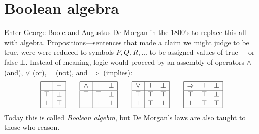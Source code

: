 \section{Boolean algebra}
Enter
George Boole and Augustus De Morgan in the 1800's to replace 
this all with algebra.  Propositions---sentences that made a 
claim we might judge to be true, were 
were reduced to symbols $P,Q,R,\ldots$
to be assigned values of true $\top$ or false $\bot$. 
Instead of meaning, logic would proceed by an assembly of 
operators $\wedge$ (and), $\vee$ (or), $\neg$ (not), and $\Rightarrow$ (implies):
\begin{gather*}
    \begin{array}{|c|c|}
        \hline 
         & \neg \\
        \hline 
        \top & \bot \\
        \bot & \top\\
        \hline
    \end{array}
    \qquad
    \begin{array}{|c|cc|}
        \hline 
        \wedge & \top & \bot\\
        \hline 
        \top & \top & \bot \\
        \bot & \bot & \bot\\
        \hline
    \end{array}
    \qquad 
    \begin{array}{|c|cc|}
        \hline 
        \vee & \top & \bot\\
        \hline 
        \top & \top & \top \\
        \bot & \top & \bot\\
        \hline
    \end{array}
    \qquad
    \begin{array}{|c|cc|}
        \hline 
        \Rightarrow & \top & \bot\\
        \hline 
        \top & \top & \bot \\
        \bot & \top & \top\\
        \hline
    \end{array}
\end{gather*}
Today this is called \emph{Boolean algebra}, but De Morgan's laws 
are also taught to those who reason.

